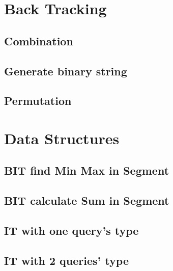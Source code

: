 \section{Back Tracking}
\subsection{Combination}
\raggedbottom
\hrulefill
\subsection{Generate binary string}
\raggedbottom
\hrulefill
\subsection{Permutation}
\raggedbottom
\hrulefill

\section{Data Structures}
\subsection{BIT find Min Max in Segment}
\raggedbottom
\hrulefill
\subsection{BIT calculate Sum in Segment}
\raggedbottom
\hrulefill
\subsection{IT with one query's type}
\raggedbottom
\hrulefill
\subsection{IT with 2 queries' type}
\raggedbottom
\hrulefill


